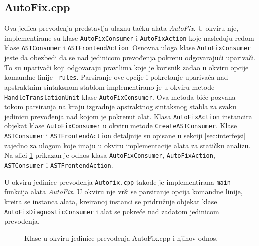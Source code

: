 \documentclass[12pt,oneside]{memoir}
\begin{document}
\subsection{AutoFix.cpp}
Ova jedica prevođenja predstavlja ulaznu ta\v{c}ku alata \textit{AutoFix}. U okviru nje, implementirane su klase \texttt{AutoFixConsumer} i \texttt{AutoFixAction} koje nasleđuju redom klase \texttt{ASTConsumer} i \texttt{ASTFrontendAction}. Osnovna uloga klase \texttt{AutoFixConsumer} jeste da obezbedi da se nad jedinicom prevođenja pokrenu odgovaraju\'{c}i upariva\v{c}i. To su upariva\v{c}i koji odgovaraju pravilima koje je korisnik zadao u okviru opcije komandne linije \texttt{--rules}. Parsiranje ove opcije i  pokretanje upariva\v{c}a nad apstraktnim sintaksnom stablom implementirano je u okviru metode \texttt{HandleTranslation\-Unit} klase \texttt{AutoFixConsumer}. Ova metoda bi\'{c}e pozvana tokom parsiranja na kraju izgradnje apstraktnog sintaksnog stabla za svaku jedinicu prevođenja nad kojom je pokrenut alat. Klasa \texttt{AutoFixAction} instancira objekat klase \texttt{AutoFixConsumer} u okviru metode \texttt{CreateASTConsumer}. Klase \texttt{ASTConsumer} i \texttt{ASTFrontendAction} detaljnije su opisane u sekciji \ref{sec:interfejsi} zajedno za ulogom koje imaju u okviru implementacije alata za stati\v{c}ku analizu. 
Na slici \ref{fig:uml1} prikazan je odnos klasa \texttt{AutoFixConsumer}, \texttt{AutoFixAction}, \texttt{ASTConsumer} i \texttt{ASTFrontendAction}. \par
U okviru jedinice prevođenja \texttt{Autofix.cpp} takođe je implementirana \texttt{main} funkcija alata \textit{AutoFix}. U okviru nje vr\v{s}i se parsiranje opcija komandne linije, kreira se instanca alata, kreiranoj instanci se pridru\v{z}uje objekat klase \texttt{AutoFix\-DiagnosticConsumer} i alat se pokre\'{c}e nad zadatom jedinicom prevođenja. 

\begin{figure}
  \caption{Klase u okviru jedinice prevođenja AutoFix.cpp i njihov odnos.}
  \label{fig:uml1}

\end{figure}
\end{document}
